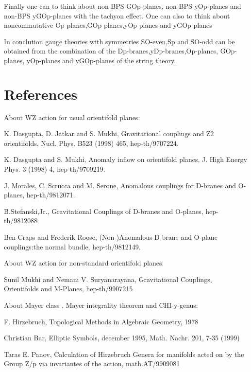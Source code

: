 \documentclass[a4paper,a4paper]{article}
\begin{document}
Finally one can to think about non-BPS GOp-planes, non-BPS yOp-planes and non-BPS yGOp-planes with the tachyon effect. One can also to think about noncommutative Op-planes,GOp-planes,yOp-planes and yGOp-planes

In conclution gauge theories with symmetries SO-even,Sp and SO-odd can be obtained from the combination of the Dp-branes,yDp-branes,Op-planes, GOp-planes, yOp-planes and yGOp-planes of the string theory.

\section{References}

\setlength{\baselineskip}{20pt}
About WZ action for usual orientifold planes:

K. Dasgupta, D. Jatkar and S. Mukhi, Gravitational couplings and Z2 orientifolds, Nucl. Phys. B523 (1998) 465, hep-th/9707224.

K. Dasgupta and S. Mukhi, Anomaly inflow on orientifold planes, J. High Energy Phys. 3 (1998) 4, hep-th/9709219.

J. Morales, C. Scrucca and M. Serone, Anomalous couplings for D-branes and O-planes, hep-th/9812071.

B.Stefanski,Jr., Gravitational Couplings of D-branes and O-planes, hep-th/9812088

Ben Craps and Frederik Roose, (Non-)Anomalous D-brane and O-plane couplings:the normal bundle,  hep-th/9812149.

About WZ action for non-standard orientifold planes:

Sunil Mukhi and Nemani V. Suryanarayana,  Gravitational Couplings, Orientifolds and M-Planes,  hep-th/9907215


About Mayer class , Mayer integrality theorem and CHI-y-genus:

F. Hirzebruch, Topological Methods in Algebraic Geometry, 1978

Christian Bar,  Elliptic Symbols, december 1995, Math. Nachr. 201, 7-35 (1999)

Taras E. Panov,  Calculation of Hirzebruch Genera for manifolds acted on by the Group Z/p via invariantes of the action, math.AT/9909081

\setlength{\baselineskip}{50pt}   
\end{document}
